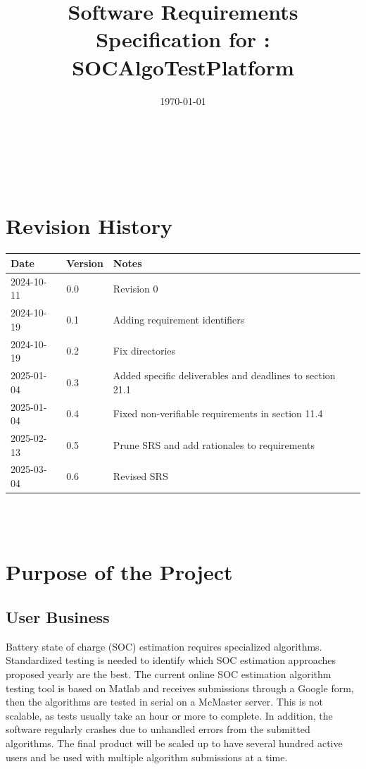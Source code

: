 \documentclass[12pt]{article}
\begin{document}
\title{Software Requirements Specification for \progname: SOCAlgoTestPlatform} 
\author{\authname}
\date{\today}
	
\maketitle

~\newpage


\tableofcontents

~\newpage

\section*{Revision History}

\begin{tabularx}{\textwidth}{p{3cm}p{2cm}X}
\toprule {\textbf{Date}} & {\textbf{Version}} & {\textbf{Notes}}\\
\midrule
2024-10-11 & 0.0 & Revision 0\\
2024-10-19 & 0.1 & Adding requirement identifiers \\
2024-10-19 & 0.2 & Fix directories \\
2025-01-04 & 0.3 & Added specific deliverables and deadlines to section 21.1 \\
2025-01-04 & 0.4 & Fixed non-verifiable requirements in section 11.4  \\
2025-02-13 & 0.5 & Prune SRS and add rationales to requirements  \\
2025-03-04 & 0.6 & Revised SRS  \\
\bottomrule
\end{tabularx}

~\\

~\newpage
\section{Purpose of the Project}
\subsection{User Business}
Battery state of charge (SOC) estimation requires specialized algorithms. Standardized testing is needed to identify which SOC estimation approaches proposed yearly are the best. The current online SOC estimation algorithm testing tool is based on Matlab and receives submissions through a Google form, then the algorithms are tested in serial on a McMaster server. This is not scalable, as tests usually take an hour or more to complete. In addition, the software regularly crashes due to unhandled errors from the submitted algorithms. The final product will be scaled up to have several hundred active users and be used with multiple algorithm submissions at a time.
\end{document}
